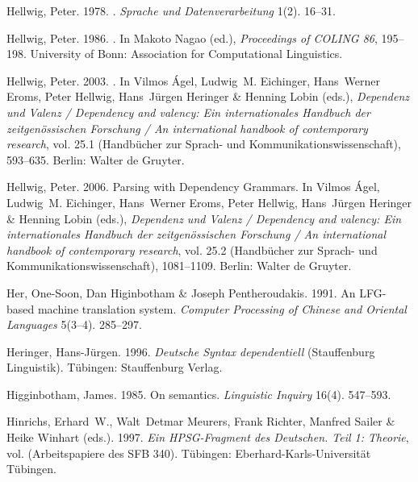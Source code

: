 \begin{thebibliography}{1420}
Hellwig, Peter. 1978.
.
\newblock \emph{Sprache und Datenverarbeitung} 1(2). 16--31.

Hellwig, Peter. 1986.
.
\newblock In Makoto Nagao (ed.), \emph{Proceedings of {COLING} 86}, 195--198.
  University of Bonn: Association for Computational Linguistics.

Hellwig, Peter. 2003.
.
\newblock In Vilmos {\'A}gel, Ludwig~M. Eichinger, Hans~Werner Eroms, Peter
  Hellwig, Hans~J{\"u}rgen Heringer \& Henning Lobin (eds.), \emph{{Dependenz
  und Valenz} / {Dependency} and valency: {Ein internationales Handbuch der
  zeitgen{\"o}ssischen Forschung} / {An} international handbook of contemporary
  research}, vol. 25.1  (Hand\-b{\"u}\-cher zur Sprach- und
  Kommunikationswissenschaft), 593--635. Berlin: Walter de Gruyter.

Hellwig, Peter. 2006.
\newblock Parsing with {Dependency Grammars}.
\newblock In Vilmos {\'A}gel, Ludwig~M. Eichinger, Hans~Werner Eroms, Peter
  Hellwig, Hans~J{\"u}rgen Heringer \& Henning Lobin (eds.), \emph{{Dependenz
  und Valenz} / {Dependency} and valency: {Ein internationales Handbuch der
  zeitgen{\"o}ssischen Forschung} / {An} international handbook of contemporary
  research}, vol. 25.2  (Hand\-b{\"u}\-cher zur Sprach- und
  Kommunikationswissenschaft), 1081--1109. Berlin: Walter de Gruyter.

Her, One-Soon, Dan Higinbotham \& Joseph Pentheroudakis. 1991.
\newblock An {LFG}-based machine translation system.
\newblock \emph{Computer Processing of {Chinese} and Oriental Languages}
  5(3--4). 285--297.

Heringer, Hans-J{\"u}rgen. 1996.
\newblock \emph{{Deutsche Syntax dependentiell}}  (Stauffenburg Linguistik).
\newblock T{\"u}bingen: Stauffenburg Verlag.

Higginbotham, James. 1985.
\newblock On semantics.
\newblock \emph{Linguistic Inquiry} 16(4). 547--593.

Hinrichs, Erhard~W., Walt~Detmar Meurers, Frank Richter, Manfred Sailer \&
  Heike Winhart (eds.). 1997.
\newblock \emph{{Ein HPSG-Fragment des Deutschen. Teil 1: Theorie}}, vol.   (Arbeitspapiere des SFB 340).
\newblock T\"u\-bing\-en: Eberhard-Karls-Uni\-ver\-si\-t{\"a}t T{\"u}bingen.


\end{thebibliography}
